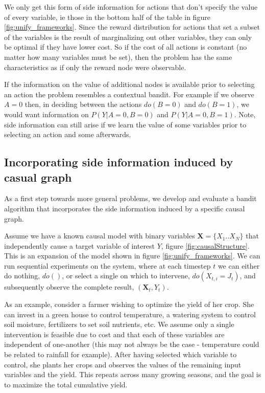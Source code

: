 \documentclass[11pt,a4paper]{article}
\begin{document}
We only get this form of side information for actions that don't specify the value of every variable, ie those in the bottom half of the table in figure \ref{fig:unify_frameworks}. Since the reward distribution for actions that set a subset of the variables is the result of marginalizing out other variables, they can only be optimal if they have lower cost. So if the cost of all actions is constant (no matter how many variables must be set), then the problem has the same characteristics as if only the reward node were observable.

If the information on the value of additional nodes is available prior to selecting an action the problem resembles a contextual bandit. For example if we observe $A = 0$ then, in deciding between the actions $do(B=0)$ and $do(B=1)$, we would want information on $P(Y|A=0,B=0)$ and $P(Y|A=0,B=1)$.  Note, side information can still arise if we learn the value of some variables prior to selecting an action and some afterwards. 


\subsection{Incorporating side information induced by casual graph}

As a first step towards more general problems, we develop and evaluate a bandit algorithm that incorporates the side information induced by a specific causal graph. 

Assume we have a known causal model with binary variables $\boldsymbol{X} = \{X_{1}..X_{N}\}$ that independently cause a target variable of interest $Y$, figure \ref{fig:causalStructure}. This is an expansion of the model shown in figure \ref{fig:unify_frameworks}. We can run sequential experiments on the system, where at each timestep $t$ we can either do nothing, $do()$, or select a single on which to intervene, $do(X_{t,i} = J_t)$, and subsequently observe the complete result, $(\boldsymbol{X}_{t},Y_{t})$. 

As an example, consider a farmer wishing to optimize the yield of her crop. She can invest in a green house to control temperature, a watering system to control soil moisture, fertilizers to set soil nutrients, etc. We assume only a single intervention is feasible due to cost and that each of these variables are independent of one-another (this may not always be the case - temperature could be related to rainfall for example). After having selected which variable to control, she plants her crops and observes the values of the remaining input variables and the yield. This repeats across many growing seasons, and the goal is to maximize the total cumulative yield.
\end{document}
